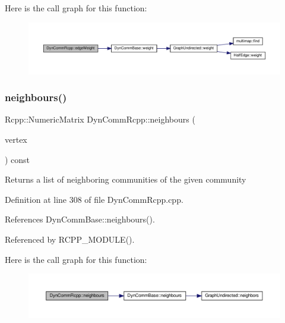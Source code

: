 Here is the call graph for this function\+:
\nopagebreak
\begin{figure}[H]
\begin{center}
\leavevmode
\includegraphics[width=350pt]{classDynCommRcpp_a9a9aaf2512541f308d935e48c583f410_cgraph}
\end{center}
\end{figure}
\mbox{\label{classDynCommRcpp_abbda8cc950c360c1b89859ebe9233535}} 
\subsubsection{\texorpdfstring{neighbours()}{neighbours()}}
{\footnotesize\ttfamily Rcpp\+::\+Numeric\+Matrix Dyn\+Comm\+Rcpp\+::neighbours (\begin{DoxyParamCaption}\item[{\hyperlink{edge_8h_a5fbd20c46956d479cb10afc9855223f6}{type\+Vertex}}]{vertex }\end{DoxyParamCaption}) const\hspace{0.3cm}{\ttfamily [inline]}}

\begin{DoxyReturn}{Returns}
a list of neighboring communities of the given community 
\end{DoxyReturn}


Definition at line 308 of file Dyn\+Comm\+Rcpp.\+cpp.



References Dyn\+Comm\+Base\+::neighbours().



Referenced by R\+C\+P\+P\+\_\+\+M\+O\+D\+U\+L\+E().

Here is the call graph for this function\+:
\nopagebreak
\begin{figure}[H]
\begin{center}
\leavevmode
\includegraphics[width=350pt]{classDynCommRcpp_abbda8cc950c360c1b89859ebe9233535_cgraph}
\end{center}
\end{figure}
\mbox{\label{classDynCommRcpp_a3d9d6845d9e67941da187bca511cdfcf}} 
